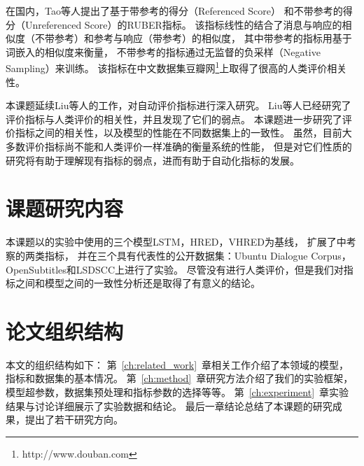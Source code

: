 在国内，Tao等人提出了基于带参考的得分（Referenced Score）
和不带参考的得分（Unreferenced Score）的RUBER指标。
该指标线性的结合了消息与响应的相似度（不带参考）和参考与响应（带参考）的相似度，
其中带参考的指标用基于词嵌入的相似度来衡量，
不带参考的指标通过无监督的负采样（Negative Sampling）来训练。
该指标在中文数据集豆瓣网\footnote{http://www.douban.com}上取得了很高的人类评价相关性。

本课题延续Liu等人的工作，对自动评价指标进行深入研究。
Liu等人已经研究了评价指标与人类评价的相关性，并且发现了它们的弱点。
本课题进一步研究了评价指标之间的相关性，以及模型的性能在不同数据集上的一致性。
虽然，目前大多数评价指标尚不能和人类评价一样准确的衡量系统的性能，
但是对它们性质的研究将有助于理解现有指标的弱点，进而有助于自动化指标的发展。

\section{课题研究内容}\label{sec:reseach_content}
本课题以\cite{VHRED}的实验中使用的三个模型LSTM，HRED，VHRED为基线，
扩展了\cite{HowNot}中考察的两类指标，
并在三个具有代表性的公开数据集：Ubuntu Dialogue Corpus，OpenSubtitles和LSDSCC上进行了实验。
尽管没有进行人类评价，但是我们对指标之间和模型之间的一致性分析还是取得了有意义的结论。

\section{论文组织结构}\label{sec:paper_organization}
本文的组织结构如下：
第~\ref{ch:related_work}~章相关工作介绍了本领域的模型，指标和数据集的基本情况。
第~\ref{ch:method}~章研究方法介绍了我们的实验框架，模型超参数，数据集预处理和指标参数的选择等等。
第~\ref{ch:experiment}~章实验结果与讨论详细展示了实验数据和结论。
最后一章结论总结了本课题的研究成果，提出了若干研究方向。
